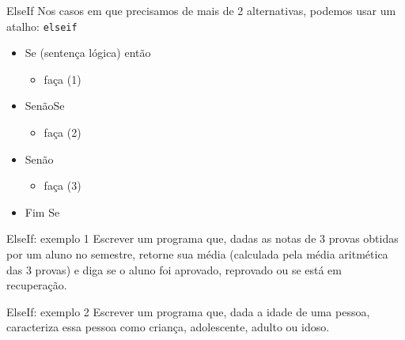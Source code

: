 \documentclass[hyperref={pdfpagelabels=false}]{beamer}
\begin{document}
\begin{frame}{ElseIf}
   Nos casos em que precisamos de mais de 2 alternativas, podemos usar um atalho: {\texttt{elseif}}
   \begin{center}
     \begin{minipage}{0.7\textwidth}
       \begin{itemize}
       \item[] Se (sentença lógica) então
	       \begin{itemize}
	       \item[] faça (1)
	       \end{itemize}
       \item[] SenãoSe
	       \begin{itemize}
	       \item[] faça (2) 
	       \end{itemize}
		   \item[] Senão
		     \begin{itemize}
		     \item[] faça (3)
		     \end{itemize}
       \item[] Fim Se 
       \end{itemize}
     \end{minipage}
   \end{center}
\end{frame}

\begin{frame}{ElseIf: exemplo 1}
  Escrever um programa que, dadas as notas de 3 provas obtidas por um aluno no semestre, retorne sua média (calculada pela média aritmética das 3 provas) e diga se o aluno foi aprovado, reprovado ou se está em recuperação.
  \begin{center}
    \begin{minipage}{0.8\textwidth}
    \end{minipage}
  \end{center}
\end{frame}

\begin{frame}{ElseIf: exemplo 2}
  Escrever um programa que, dada a idade de uma pessoa, caracteriza essa pessoa como criança, adolescente, adulto ou idoso.
  \begin{center}
    \begin{minipage}{0.85\textwidth}
      
    \end{minipage}
  \end{center}
\end{frame}
\end{document}
